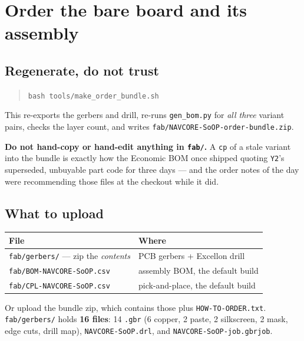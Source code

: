 \documentclass[11pt,a4paper]{article}
\newcommand{\file}[1]{\texttt{\small #1}}
\newcommand{\cmd}[1]{\texttt{\small #1}}
\newcommand{\flag}[1]{\textcolor{warnred}{\textbf{#1}}}
\begin{document}
\section{Order the bare board and its assembly}
\label{sec:order-board}

\subsection{Regenerate, do not trust}
\label{sec:regenerate}

\begin{quote}
\cmd{bash tools/make\_order\_bundle.sh}
\end{quote}

This re-exports the gerbers and drill, re-runs \file{gen\_bom.py} for \emph{all three}
variant pairs, checks the layer count, and writes
\file{fab/NAVCORE-SoOP-order-bundle.zip}.

\flag{Do not hand-copy or hand-edit anything in \file{fab/}.} A \cmd{cp} of a stale variant
into the bundle is exactly how the Economic BOM once shipped quoting \file{Y2}'s
superseded, unbuyable part code for three days --- and the order notes of the day were recommending
those files at the checkout while it did.

\subsection{What to upload}

\begin{center}
\begin{tabular}{@{}ll@{}}
\toprule
\textbf{File} & \textbf{Where} \\
\midrule
\file{fab/gerbers/} --- zip the \emph{contents} & PCB gerbers + Excellon drill \\
\file{fab/BOM-NAVCORE-SoOP.csv} & assembly BOM, the default build \\
\file{fab/CPL-NAVCORE-SoOP.csv} & pick-and-place, the default build \\
\bottomrule
\end{tabular}
\end{center}

Or upload the bundle zip, which contains those plus \file{HOW-TO-ORDER.txt}.
\file{fab/gerbers/} holds \textbf{16 files}: 14 \file{.gbr} (6 copper, 2 paste, 2
silkscreen, 2 mask, edge cuts, drill map), \file{NAVCORE-SoOP.drl}, and
\file{NAVCORE-SoOP-job.gbrjob}.
\end{document}
